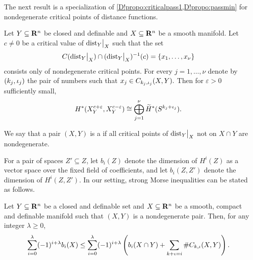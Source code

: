 The next result is a specialization of \cref{D!propo:criticalpass1,D!propo:passmin} for nondegenerate critical points of distance functions.

\begin{corollary}
\label{D!propo:criticalpass2dist}
  Let $Y\subseteq \mathbf{R}^n$ be closed and definable and $X\subseteq \mathbf{R}^n$ be a smooth manifold. Let $c\neq 0$ be a critical value of $\mathord{\operatorname{dist}}_Y\big|_X$ such that the set
  \[
    C(\mathord{\operatorname{dist}}_Y\big|_X)\cap (\mathord{\operatorname{dist}}_Y\big|_X)^{-1}(c)=\{x_1, \ldots, x_\nu\}
  \]
  consists only of nondegenerate critical points. For every $j=1, \ldots, \nu$ denote by $(k_j, \iota_j)$ the pair of numbers such that $x_j\in C_{k_j, \iota_j}(X, Y).$
  Then for $\varepsilon>0$ sufficiently small, 
  \[
    H^*(X^{ c+\varepsilon}_Y, X^{c-\varepsilon}_Y)\cong \bigoplus_{j=1}^\nu\widetilde{H}^*(S^{k_j+\iota_j}).
  \]
\end{corollary}

\begin{definition}
\label{D!D:nondegenerate-pairs}
  We say that a pair $(X,Y)$ is a  if all critical points of $\mathord{\operatorname{dist}}_Y\big|_X$ not on $X\cap Y$ are nondegenerate.
\end{definition}

For a pair of spaces $Z'\subseteq Z$, let $b_i (Z)$ denote the dimension of $H^i (Z)$ as a vector space over the fixed field of coefficients, and let $b_i (Z,Z')$ denote the dimension of $H^i (Z,Z')$. In our setting, strong Morse inequalities can be stated as follows.  

\begin{proposition}
\label{D!propo:strongMorse}
  Let $Y\subseteq \mathbf{R}^n$ be a closed and definable set and $X\subseteq \mathbf{R}^n$ be a smooth, compact and definable manifold such that $(X, Y)$ is a nondegenerate pair. 
  Then, for any integer $\lambda \ge 0$, 
  \[
    \sum_{i=0}^{\lambda} (-1)^{i+\lambda} b_i (X) \le \sum_{i=0}^{\lambda} (-1)^{i+\lambda} \left( b_i (X\cap Y) + \sum_{k+\iota=i} \# C_{k,\iota}(X,Y) \right) .
  \]
\end{proposition}

